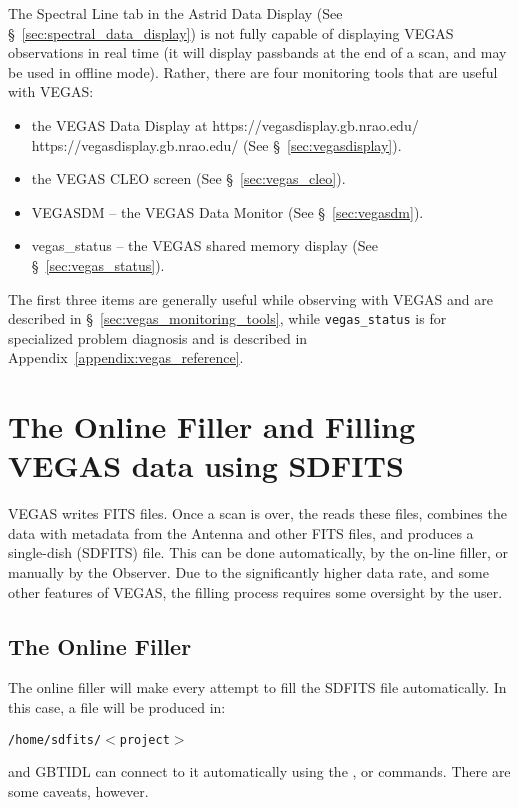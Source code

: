 The Spectral Line tab in the \gls{Astrid} Data Display (See
\S~\ref{sec:spectral_data_display}) is not fully capable of displaying
VEGAS observations in real time (it will display passbands at the end of a
scan, and may be used in offline mode). Rather, there are four monitoring tools
that are useful with VEGAS:

\begin{itemize}
\item the VEGAS Data Display at \htmladdnormallink
{https://vegasdisplay.gb.nrao.edu/}
{https://vegasdisplay.gb.nrao.edu/} (See \S~\ref{sec:vegasdisplay}).
\item the VEGAS \gls{CLEO} screen (See \S~\ref{sec:vegas_cleo}).
\item VEGASDM -- the VEGAS Data Monitor (See \S~\ref{sec:vegasdm}).
\item vegas\_status -- the VEGAS shared memory display
      (See \S~\ref{sec:vegas_status}).
\end{itemize}

The first three items are generally useful while observing with VEGAS and are
described in \S~\ref{sec:vegas_monitoring_tools}, while {\tt vegas\_status} is for
specialized problem diagnosis and is described in
Appendix~\ref{appendix:vegas_reference}.


\section{The Online Filler and Filling VEGAS data using SDFITS}
\label{sec:vegas_sdfits}
VEGAS writes  FITS files. Once a scan is over, the
 reads these files, combines the data with metadata from the
Antenna and other FITS files, and produces a single-dish (SDFITS) file.
This can be done automatically, by the on-line filler, or manually by the
Observer. Due to the significantly higher data rate, and some other features
of VEGAS, the filling process requires some oversight by the user.

\subsection{The Online Filler}\label{sec:vegas_filler}
The online filler will make every attempt to fill the SDFITS file automatically.
In this case, a file will be produced in:

{\tt /home/sdfits/$<$project$>$}

and GBTIDL can connect to it automatically using the , or
 commands. There are some caveats, however.

